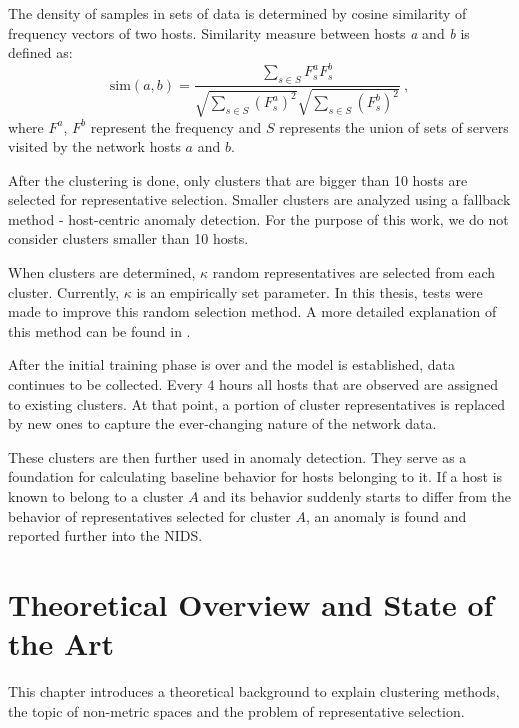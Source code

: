 \documentclass[thesis=B,english]{FITthesis}[2012/10/20]
\begin{document}
The density of samples in sets of data is determined by cosine similarity of frequency vectors of two hosts.
Similarity measure between hosts \textit{a} and \textit{b} is defined as:
\begin{equation}
\label{eq:kopp}
\textrm{sim}(a, b) = \frac{\sum\limits_{s \in S} F_s^a F_s^b} {\sqrt{\sum\limits_{s \in S} (F_s^a)^2} \sqrt{\sum\limits_{s \in S} (F_s^b)^2}}\:, \tag{2}
\end{equation}
where $F^a$, $F^b$ represent the frequency and $S$ represents the union of sets of servers visited by the network hosts $a$ and $b$.

After the clustering is done, only clusters that are bigger than 10 hosts are selected for representative selection.
Smaller clusters are analyzed using a fallback method - host-centric anomaly detection.
For the purpose of this work, we do not consider clusters smaller than 10 hosts.

When clusters are determined, $\kappa$ random representatives are selected from each cluster.
Currently, $\kappa$ is an empirically set parameter.
In this thesis, tests were made to improve this random selection method.
A more detailed explanation of this method can be found in \cite{kopp2018community}.

After the initial training phase is over and the model is established, data continues to be collected.
Every 4 hours all hosts that are observed are assigned to existing clusters.
At that point, a portion of cluster representatives is replaced by new ones to capture the ever-changing nature of the network data.

These clusters are then further used in anomaly detection.
They serve as a foundation for calculating baseline behavior for hosts belonging to it.
If a host is known to belong to a cluster $A$ and its behavior suddenly starts to differ from the behavior of representatives selected for cluster $A$, an anomaly is found and reported further into the NIDS.


\chapter{Theoretical Overview and State of the Art}\label{ch:theory}

This chapter introduces a theoretical background to explain clustering methods, the topic of non-metric spaces and the problem of representative selection.
\end{document}
